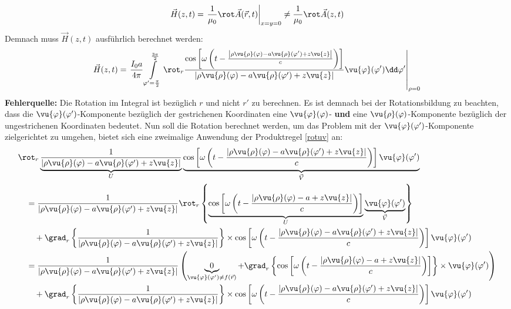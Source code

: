 \begin{equation}
	\vec{H}(z, {t})=\left.\frac{1}{\mu_0}\rot\vec{A}(\vec{r}, {t}) \right|_{x=y=0}\neq \frac{1}{\mu_0}\rot\vec{A}(z, {t})
\end{equation}
Demnach muss $\vec{H}(z, {t})$ ausführlich berechnet werden:
\begin{equation}
		\vec{{H}}(z, {t})=\left.\frac{I_{0} a}{4 \pi} \int\limits_{\varphi'=\frac{\pi}{2}}^{\frac{3\pi}{2}} \rot_r\frac{\cos\left[\omega \left({t}-\frac{\left|\rho\vu{\rho}(\varphi)-a\vu{\rho}(\varphi')+z\vu{z}\right|}{{c}}\right)\right] }{\left|\rho\vu{\rho}(\varphi)-a\vu{\rho}(\varphi')+z\vu{z}\right|} \vu{\varphi}(\varphi')\dd \varphi'\right|_{\rho=0}
\end{equation}
\textbf{Fehlerquelle:} Die Rotation im Integral ist bezüglich $r$ und nicht $r'$ zu berechnen. Es ist demnach bei der Rotationsbildung zu beachten, dass die $\vu{\varphi}(\varphi')$-Komponente bezüglich der gestrichenen Koordinaten eine $\vu{\varphi}(\varphi)$- \textbf{und} eine $\vu{\rho}(\varphi)$-Komponente bezüglich der ungestrichenen Koordinaten bedeutet. Nun soll die Rotation berechnet werden, um das Problem mit der $\vu{\varphi}(\varphi')$-Komponente zielgerichtet zu umgehen, bietet sich eine zweimalige Anwendung der Produktregel \ref{rotuv} an:
\begin{equation*}\begin{split}
	&\rot_r\underbrace{\frac{1}{\left|\rho\vu{\rho}(\varphi)-a\vu{\rho}(\varphi')+z\vu{z}\right|}}_{U} \underbrace{\cos\left[\omega \left({t}-\frac{\left|\rho\vu{\rho}(\varphi)-a\vu{\rho}(\varphi')+z\vu{z}\right|}{{c}}\right)\right]  \vu{\varphi}(\varphi')}_{\vec{V}}\\
	&\quad=\frac{1}{\left|\rho\vu{\rho}(\varphi)-a\vu{\rho}(\varphi')+z\vu{z}\right|}\rot_r\left\{\underbrace{\cos\left[\omega \left({t}-\frac{\left|\rho\vu{\rho}(\varphi)-a+z\vu{z}\right|}{{c}}\right)\right]}_{U} \underbrace{\vu{\varphi}(\varphi')}_{\vec{V}}  \right\} \\
	&\quad\quad+ \grad_r\left\{\frac{1}{\left|\rho\vu{\rho}(\varphi)-a\vu{\rho}(\varphi')+z\vu{z}\right|}\right\}\times\cos\left[\omega \left({t}-\frac{\left|\rho\vu{\rho}(\varphi)-a\vu{\rho}(\varphi')+z\vu{z}\right|}{{c}}\right)\right]  \vu{\varphi}(\varphi')\\
	&\quad=\frac{1}{\left|\rho\vu{\rho}(\varphi)-a\vu{\rho}(\varphi')+z\vu{z}\right|}\left( \underbrace{0}_{\vu{\varphi}(\varphi')\neq f(\vec{r})}+ \grad_r\left\{\cos\left[\omega \left({t}-\frac{\left|\rho\vu{\rho}(\varphi)-a+z\vu{z}\right|}{{c}}\right)\right]\right\}\times\vu{\varphi}(\varphi') \right)\\
	&\quad\quad+ \grad_r\left\{\frac{1}{\left|\rho\vu{\rho}(\varphi)-a\vu{\rho}(\varphi')+z\vu{z}\right|}\right\}\times\cos\left[\omega \left({t}-\frac{\left|\rho\vu{\rho}(\varphi)-a\vu{\rho}(\varphi')+z\vu{z}\right|}{{c}}\right)\right]  \vu{\varphi}(\varphi')
\end{split}\end{equation*}
